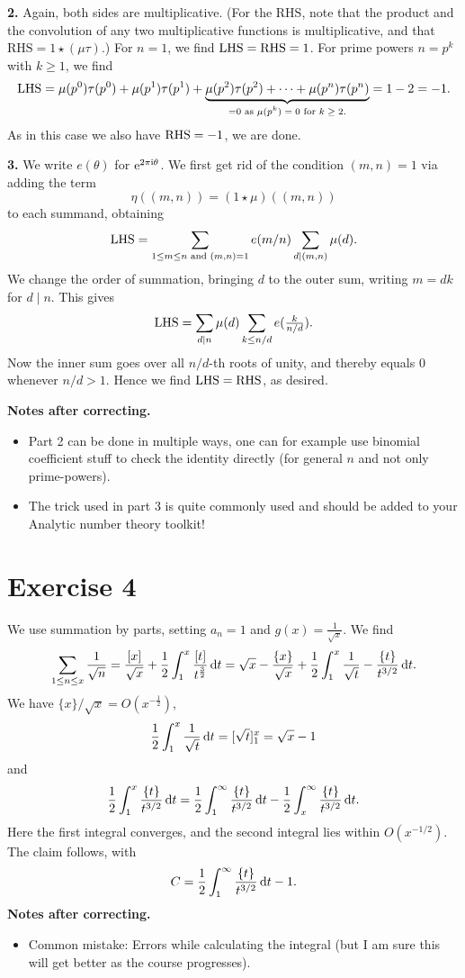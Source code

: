 \documentclass[a4paper,11pt]{article}
\begin{document}
\textbf{2.} Again, both sides are multiplicative. (For the RHS, note that the product and the
convolution of any two multiplicative functions is multiplicative, and that 
$\text{RHS} = 1 \star (\mu \tau)$.) For $n = 1$, we find $\mathrm{LHS} = \mathrm{RHS} = 1$. For
prime powers $n = p^k$ with $k \geq 1$, we find 
\[
    \mathrm{LHS} = \mu(p^0) \tau(p^0) + \mu(p^1) \tau(p^1) + \underbrace{ \mu(p^2) \tau(p^2) + \dots 
+ \mu(p^n) \tau(p^n) }_{= 0 \text{ as $\mu(p^k) = 0$ for $k \geq 2$.}} = 1 - 2 = -1.
\]
As in this case we also have $\mathrm{RHS} = -1$, we are done. 

\textbf{3.} We write $e(\theta)$ for $\mathrm e^{2 \pi \mathrm i \theta}$. We first get rid of
the condition $(m,n) = 1$ via adding the term 
\[
    \eta((m,n)) = (1 \star \mu)((m,n))
\]
to each summand, obtaining
\[
    \mathrm{LHS} = \sum_{1 \leq m \leq n \text{ and } (m,n) = 1} e(m/n) \sum_{d \mid (m,n)} \mu(d).
\]
We change the order of summation, bringing $d$ to the outer sum, writing $m =
dk$ for $d \mid n$. This gives
\[
    \mathrm{LHS} = \sum_{d \mid n} \mu(d) \sum_{k \leq n/d} e(\tfrac{k}{n/d}).
\]
Now the inner sum goes over all $n/d$-th roots of unity, and thereby equals $0$ whenever 
$n/d > 1$. Hence we find 
$\mathrm{LHS} = \mathrm{RHS}$, as desired. 

\textbf{Notes after correcting.} \leavevmode
\begin{itemize}
    \item Part 2 can be done in multiple ways, one can for example use binomial coefficient stuff
        to check the identity directly (for general $n$ and not only prime-powers). 
    \item The trick used in part $3$ is quite commonly used and should be
        added to your Analytic number theory toolkit!  
\end{itemize}

\section*{Exercise 4}
We use summation by parts, setting $a_n = 1$ and $g(x) = \frac 1{\sqrt x}$. We find
\[
    \sum_{1 \leq n \leq x} \frac 1 {\sqrt n} = \frac{[x]}{\sqrt x} + \frac 12 \int_1^x
    \frac{[t]}{t^{\frac 32}} \mathrm{\,d} t = \sqrt x - \frac{\{x\}}{\sqrt x} + \frac 12 \int_1^x
    \frac 1{\sqrt t} - \frac{\{t\}}{t^{3/2}} \mathrm{\,d} t.
\]
We have $\{x\}/\sqrt x = O(x^{-\frac12})$,
\[
    \frac 12 \int_1^x \frac 1{\sqrt t} \mathrm{\,d} t= [\sqrt t]_1^x = \sqrt x - 1
\]
and 
\[
    \frac 12 \int_1^x \frac{\{t\}}{t^{3/2}} \mathrm{\,d} t = \frac 12 \int_1^\infty \frac{\{t\}}{t^{3/2}} \mathrm{\,d} t -  \frac 12 \int_x^\infty \frac{\{t\}}{t^{3/2}} \mathrm{\,d} t.
\]
Here the first integral converges, and the second integral lies within $O(x^{-1/2})$. The claim
follows, with 
\[
    C = \frac 12 \int_1^\infty \frac{\{t\}}{t^{3/2}} \mathrm{\,d} t  -1.
\]
\textbf{Notes after correcting.} \leavevmode
\begin{itemize}
    \item Common mistake: Errors while calculating the integral (but I am sure
        this will get better as the course progresses).
\end{itemize}
\end{document}
